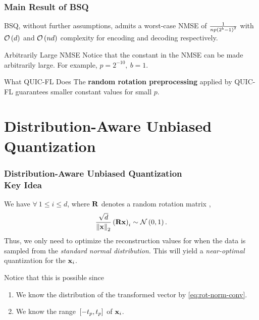 \documentclass{beamer}
\begin{document}
    \begin{frame}
        \frametitle{Main Result of BSQ}
        \begin{lemma}
            BSQ, without further assumptions, admits a worst-case NMSE of
            \(\frac{1}{np\left(2^b-1\right)^2}\) with \(\mathcal O\left(d\right)\) and
            \(\mathcal O\left(nd\right)\) complexity for encoding and decoding respectively.
        \end{lemma}
        \begin{exampleblock}{Arbitrarily Large NMSE}
            Notice that the constant in the NMSE can be made arbitrarily large.
            For example, \(p = 2^{-10},\ b = 1\).
        \end{exampleblock}
        \begin{alertblock}{What QUIC-FL Does}
            The \textbf{random rotation preprocessing} applied by QUIC-FL
            guarantees smaller constant values for small \(p\).
        \end{alertblock}
    \end{frame}
    
    \section{Distribution-Aware Unbiased Quantization}
    \begin{frame}
        \frametitle{Distribution-Aware Unbiased Quantization\\\small Key Idea}
        We have \(\forall\ 1 \le i \le d\), where \(\boldsymbol{\mathbf{R}}\) denotes a random
        rotation matrix \cite{DBLP:journals/corr/abs-2105-08339},
        \begin{equation}
            \frac{\sqrt{d}}{\left\lVert\boldsymbol{\mathbf{x}}\right\rVert_2}\left(\boldsymbol{\mathbf{Rx}}\right)_i \sim \mathcal N\left(0,1\right).
            \label{eq:rot-norm-conv}
        \end{equation}
        Thus, we only need to optimize the reconstruction values for when the
        data is sampled from the \emph{standard normal distribution}. This will
        yield a \emph{near-optimal} quantization for the \(\boldsymbol{\mathbf{x}}_i\).

        Notice that this is possible since
        \begin{enumerate}
            \item We know the distribution of the transformed vector by
            \eqref{eq:rot-norm-conv}.
            \item We know the range \({}\left[-t_p, t_p\right]\) of \(\boldsymbol{\mathbf{x}}_i\).
        \end{enumerate}
    \end{frame}
    
\end{document}
